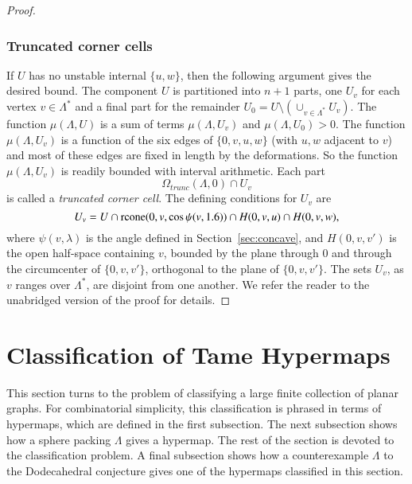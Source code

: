 \documentclass{article} %
\begin{document}
\begin{proof}
\subsubsection {Truncated corner cells}  If $U$ has no unstable
internal $\{u,w\}$, then the following argument gives the
desired bound.  The component $U$ is partitioned into $n+1$
parts, one $U_v$ for each vertex $v\in\Lambda^*$ and a final part
for the remainder $U_0 = U\setminus(\cup_{v\in\Lambda^*} U_v)$.
The function $\mu(\Lambda,U)$ is a sum of terms $\mu(\Lambda,U_v)$
and $\mu(\Lambda,U_0) >0$.  The function $\mu(\Lambda,U_v)$
is a function of the six edges of $\{0,v,u,w\}$ (with $u,w$
adjacent to $v$) and most of these edges are fixed in length
by the deformations.  So the function $\mu(\Lambda,U_v)$
is readily bounded with interval arithmetic.  Each part
$$\Omega_{trunc}(\Lambda,0)\cap U_v$$
is called a {\it truncated corner cell}.  The defining conditions
for $U_v$ are
  $$
  U_v = U \cap {\operatorname{rcone}}(0,v,\cos\psi(v,1.6)) \cap H(0,v,u) \cap H(0,v,w),
  $$
where $\psi(v,\lambda)$ is the angle defined in Section~\ref{sec:concave},
and $H(0,v,v')$ is the open half-space containing $v$, bounded by
the plane through $0$ and through the circumcenter
of $\{0,v,v'\}$, orthogonal to the plane of $\{0,v,v'\}$.  The
sets $U_v$, as $v$ ranges over $\Lambda^*$, are disjoint from one
another.
%
%
We refer the reader to the unabridged version of the proof for details.
\end{proof}

\section{Classification of Tame Hypermaps}

This section turns to the problem of classifying a large finite collection
of planar graphs. For combinatorial simplicity, this classification is phrased
in terms of hypermaps, which are defined in the first subsection.
The next subsection shows how a sphere packing $\Lambda$ gives a hypermap.
The rest of the section is devoted to the classification problem.
A final subsection shows how a counterexample $\Lambda$ to the Dodecahedral
conjecture gives one of the hypermaps classified in this section.
\end{document}

